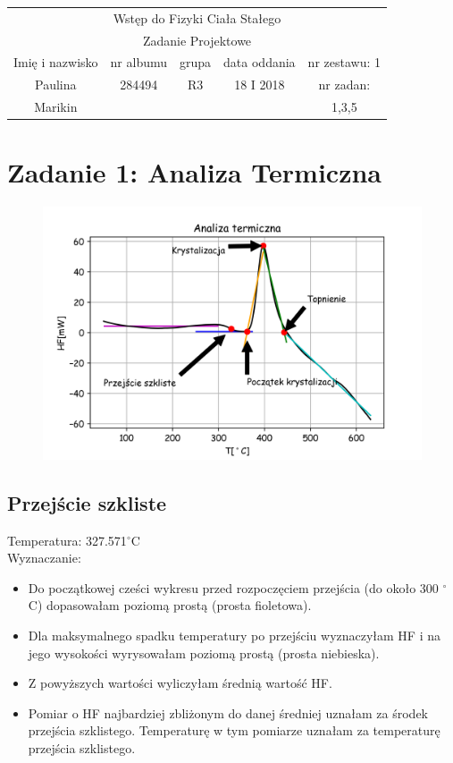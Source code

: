 \documentclass[a4paper,10pt]{article}
\def\arraystretch{1.2}
\begin{document}
\begin{table}
  \centering
  \def\arraystretch{1.5}
    \begin{tabular}{|c|c|c|c|c|} \hline
    \multicolumn{5}{|c|}{Wstęp do Fizyki Ciała Stałego}\\
		\multicolumn{5}{|c|}{Zadanie Projektowe} \\\hline
    Imię i nazwisko	&	nr albumu	&	grupa	&	data oddania	&	nr zestawu: 1	\\\hline
				Paulina			&		284494	&		R3	&		18 I 2018		&	nr zadan:  \\
				Marikin			&						&				&								&	1,3,5 \\\hline
  \end{tabular}
\end{table}


\section{Zadanie 1: Analiza Termiczna}

\begin{figure}[H]
	\centering
		\includegraphics[width=\textwidth]{../Analiza_termiczna.png}
\end{figure}

\subsection{Przejście szkliste}
Temperatura: 327.571$^\circ$C \\
Wyznaczanie:
\begin{itemize}
	\item Do początkowej cześci wykresu przed rozpoczęciem przejścia (do około 300 $^\circ$C) dopasowałam poziomą prostą (prosta fioletowa).
	\item Dla maksymalnego spadku temperatury po przejściu wyznaczyłam HF i na jego wysokości wyrysowałam poziomą prostą (prosta niebieska).
	\item Z powyższych wartości wyliczyłam średnią wartość HF.
	\item Pomiar o HF najbardziej zbliżonym do danej średniej uznałam za środek przejścia szklistego. Temperaturę w tym pomiarze uznałam za temperaturę przejścia szklistego.
\end{itemize}
\newpage
\end{document}
